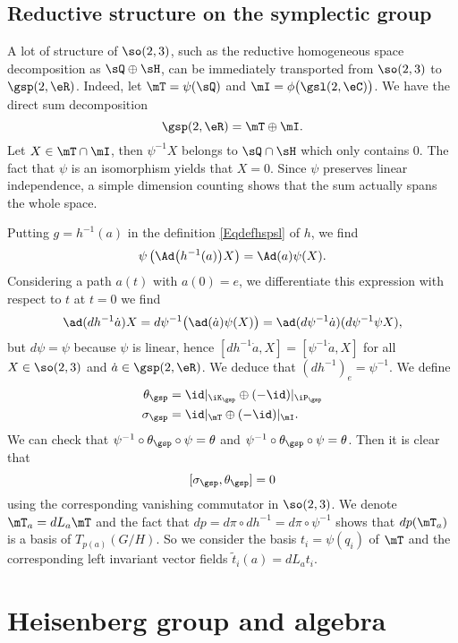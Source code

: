 \subsection{Reductive structure on the symplectic group}		\label{SubSecRedspT}

A lot of structure of $\so(2,3)$, such as the reductive homogeneous space decomposition as $\sQ\oplus\sH$, can be immediately transported from $\so(2,3)$ to $\gsp(2,\eR)$. Indeed, let $\mT=\psi(\sQ)$ and $\mI=\phi\big( \gsl(2,\eC) \big)$. We have the direct sum decomposition
\[
\gsp(2,\eR)=\mT\oplus\mI.
\]
 Let $X\in\mT\cap\mI$, then $\psi^{-1}X$ belongs to $\sQ\cap\sH$ which only contains $0$. The fact that $\psi$ is an isomorphism yields that $X=0$. Since $\psi$ preserves linear independence, a simple dimension counting shows that the sum actually spans the whole space.

Putting $g=h^{-1}(a)$ in the definition \eqref{Eqdefhspsl} of $h$, we find
\[
  \psi\left( \Ad\big( h^{-1}(a) \big)X \right)=\Ad(a)\psi(X).
\]
Considering a path $a(t)$ with $a(0)=e$, we differentiate this expression with respect to $t$ at $t=0$ we find
\[
  \ad(dh^{-1}\dot a)X=d\psi^{-1}\big( \ad(\dot a)\psi(X) \big)=\ad(d\psi^{-1}\dot a)(d\psi^{-1}\psi X),
\]
but $d\psi=\psi$ because $\psi$ is linear, hence $[dh^{-1}\dot a,X]=[\psi^{-1}\dot a,X]$ for all $X\in \so(2,3)$ and $\dot a\in \gsp(2,\eR)$. We deduce that $(dh^{-1})_e=\psi^{-1}$. We define
\begin{align*}
	\theta_{\gsp}&=\id|_{\iK_{\gsp}}\oplus(-\id)|_{\iP_{\gsp}}\\
	\sigma_{\gsp}&=\id|_{\mT}\oplus(-\id)|_{\mI}.
\end{align*}
We can check that $\psi^{-1}\circ\theta_{\gsp}\circ\psi=\theta$ and $\psi^{-1}\circ\theta_{\gsp}\circ\psi=\theta$. Then it is clear that
\[
  [\sigma_{\gsp},\theta_{\gsp}]=0
\]
using the corresponding vanishing commutator in $\so(2,3)$. We denote $\mT_a=dL_a\mT$ and the fact that $dp= d\pi\circ dh^{-1}= d\pi\circ \psi^{-1}$ shows that $dp(\mT_a)$ is a basis of $T_{p(a)}(G/H)$. So we consider the basis $t_i=\psi(q_i)$ of $\mT$ and the corresponding left invariant vector fields $\tilde t_i(a)=dL_at_i$.


\section{Heisenberg group and algebra}


